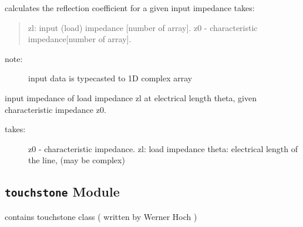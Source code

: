 \documentclass[letterpaper,10pt,english]{sphinxmanual}
\begin{document}

\begin{fulllineitems}
\label{api/mwavepy:mwavepy.tlineFunctions.zl_2_Gamma0}
calculates the reflection coefficient for a given input impedance 
takes:
\begin{quote}

zl: input (load) impedance {[}number of array{]}.  
z0 - characteristic impedance{[}number of array{]}.
\end{quote}
\begin{description}
\item[{note:}] \leavevmode
input data is typecasted to 1D complex array

\end{description}

\end{fulllineitems}


\begin{fulllineitems}
\label{api/mwavepy:mwavepy.tlineFunctions.zl_2_Gamma_in}
\end{fulllineitems}


\begin{fulllineitems}
\label{api/mwavepy:mwavepy.tlineFunctions.zl_2_zin}
input impedance of load impedance zl at electrical length theta, 
given characteristic impedance z0.
\begin{description}
\item[{takes:}] \leavevmode
z0 - characteristic impedance. 
zl: load impedance
theta: electrical length of the line, (may be complex)

\end{description}

\end{fulllineitems}



\subsection{\texttt{touchstone} Module}
\label{api/mwavepy:module-mwavepy.touchstone}\label{api/mwavepy:touchstone-module}
contains touchstone class
( written by Werner Hoch )
\end{document}
